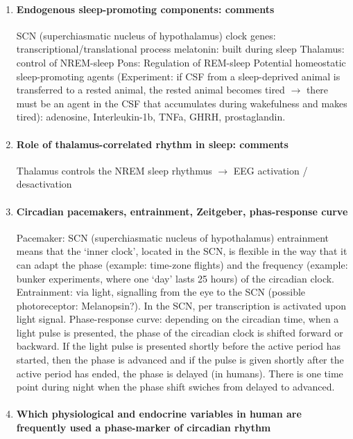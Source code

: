 \documentclass[12pt,article,oneside,a4paper]{memoir}
\begin{document}
\begin{enumerate}
\item \paragraph{Endogenous sleep-promoting components: comments}

SCN (superchiasmatic nucleus of hypothalamus)
	clock genes: transcriptional/translational process
	melatonin: built during sleep
	Thalamus: control of NREM-sleep
	Pons: Regulation of REM-sleep
	Potential homeostatic sleep-promoting agents (Experiment: if CSF from a sleep-deprived animal is transferred to a rested animal, the rested animal becomes tired $\rightarrow$ there must be an agent in the CSF that accumulates during wakefulness and makes tired): adenosine, Interleukin-1b, TNFa, GHRH, prostaglandin.

\item \paragraph{Role of thalamus-correlated rhythm in sleep: comments}

Thalamus controls the NREM sleep rhythmus $\rightarrow$ EEG activation / desactivation

\item \paragraph{Circadian pacemakers, entrainment, Zeitgeber, phas-response curve}

Pacemaker: SCN (superchiasmatic nucleus of hypothalamus)
	entrainment means that the ‘inner clock’, located in the SCN, is flexible in the way that it can adapt the phase (example: time-zone flights) and the frequency (example: bunker experiments, where one ‘day’ lasts 25 hours) of the circadian clock.
	Entrainment: via light, signalling from the eye to the SCN (possible photoreceptor: Melanopsin?). In the SCN, per transcription is activated upon light signal.
Phase-response curve: depending on the circadian time, when a light pulse is presented, the phase of the circadian clock is shifted forward or backward. If the light pulse is presented shortly before the active period has started, then the phase is advanced and if the pulse is given shortly after the active period has ended, the phase is delayed (in humans). There is one time point during night when the phase shift swiches from delayed to advanced.

\item \paragraph{Which physiological and endocrine variables in human are frequently used a phase-marker of circadian rhythm}


\end{enumerate}
\end{document}
